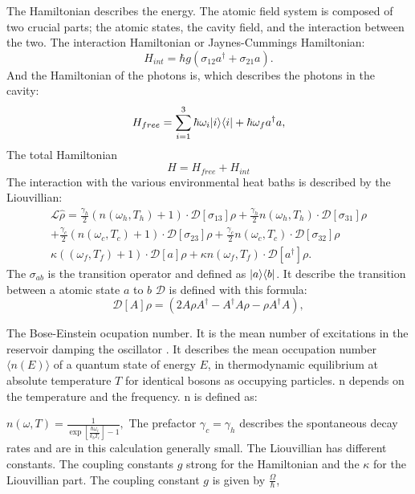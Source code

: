 \documentclass[12pt,a4paper]{article}
\DeclarePairedDelimiter\bra{\langle}{\rvert}
\DeclarePairedDelimiter\ket{\lvert}{\rangle}
\begin{document}
The Hamiltonian describes the energy. 
The atomic field system is composed of two crucial 
parts; the atomic states, the cavity field, and the interaction between the two.
The interaction Hamiltonian or Jaynes-Cummings Hamiltonian:
\begin{equation}
H_{int}=\hbar g(\sigma_{12}a^{\dag}+\sigma_{21}a).
\end{equation}
And the Hamiltonian of the photons is, which describes the photons in the cavity:
\begin{equation}
H_{free}=\sum_{i=1}^3 \hbar \omega_i \ket{i}\bra{i}+\hbar \omega_f a^{\dag}a,
\end{equation}
The total Hamiltonian
\begin{equation}
H=H_{free}+H_{int}
\end{equation}
\newpage
The interaction with the various environmental heat baths is described by the Liouvillian:
\begin{equation}
\begin{aligned}
\mathcal{L}\hat{\rho}=\frac{\gamma_h}{2}(n(\omega_h,T_h)+1)   \cdot \mathcal{D}[\sigma_{13}]\rho
+\frac{\gamma_h}{2}n(\omega_h,T_h)\cdot \mathcal{D}[\sigma_{31}]\rho \\
+\frac{\gamma_c}{2}(n(\omega_c,T_c)+1)\cdot \mathcal{D}[\sigma_{23}]\rho
+\frac{\gamma_c}{2}n(\omega_c,T_c) \cdot \mathcal{D}[\sigma_{32}]\rho \\
\kappa((\omega_f,T_f)+1)	\cdot\mathcal{D}[a]\rho+
\kappa n(\omega_f,T_f)\cdot \mathcal{D}[a^{\dag}]\rho.
\end{aligned}
\end{equation}
The $\sigma_{ab} $ is the transition operator and defined as $ \ket{a}\bra{b}$. It describe the transition between a atomic state $a$ to $b$
$\mathcal{D}$ is defined with this formula:
\begin{equation}
\mathcal{D}[A]\rho=(2A \rho	A^{\dag}-A^{\dag}A\rho-\rho A^{\dag}A),
\end{equation}

The Bose-Einstein ocupation number. It is the mean number of excitations in the reservoir damping the oscillator  . It describes the mean occupation number $\langle n(E) \rangle$ of a quantum state of energy $E$, in thermodynamic equilibrium at absolute temperature $T $ for identical bosons as occupying particles. n depends on the temperature and the frequency.
n is defined as:

$
n(\omega,T)=\frac{1}{\exp[\frac{\hbar \omega_i}{k_b T_i}]-1},
$
The  prefactor $\gamma_c=\gamma_h$ describes the spontaneous decay rates and are in this calculation generally small.
The Liouvillian has different constants. The coupling constants $g$ strong for the Hamiltonian and the $\kappa$ for the Liouvillian part. 
The coupling constant $g$ is given by $\frac{\Omega}{\hbar}$,
\end{document}
